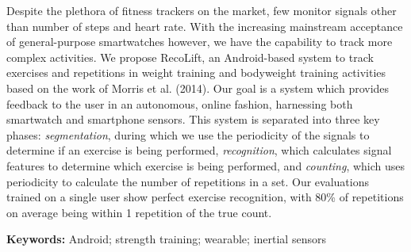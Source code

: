 Despite the plethora of fitness trackers on the market, few monitor signals other than number of steps and heart rate. With the increasing mainstream acceptance of general-purpose smartwatches however, we have the capability to track more complex activities. We propose RecoLift, an Android-based system to track exercises and repetitions in weight training and bodyweight training activities based on the work of Morris et al. (2014). Our goal is a system which provides feedback to the user in an autonomous, online fashion, harnessing both smartwatch and smartphone sensors. This system is separated into three key phases: \textit{segmentation}, during which we use the periodicity of the signals to determine if an exercise is being performed, \textit{recognition}, which calculates signal features to determine which exercise is being performed, and \textit{counting}, which uses periodicity to calculate the number of repetitions in a set. Our evaluations trained on a single user show perfect exercise recognition, with 80\% of repetitions on average being within 1 repetition of the true count. 

\smallskip
\noindent \textbf{Keywords:} Android; strength training; wearable; inertial sensors 